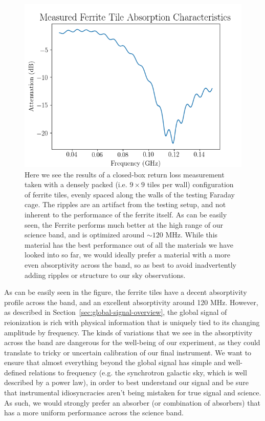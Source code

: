 \begin{figure}
    \begin{center}
    \includegraphics[width=\linewidth]{fe_absorption.png}
    \end{center}
    \caption{
        Here we see the results of a closed-box return loss measurement taken 
        with a densely packed (i.e. $9\times9$ tiles per wall) configuration of 
        ferrite tiles, evenly spaced along the walls of the testing Faraday 
        cage. The ripples are an artifact from the testing setup, and not 
        inherent to the performance of the ferrite itself. As can be easily 
        seen, the Ferrite performs much better at the high range of our science 
        band, and is optimized around $\sim120$ MHz.  While this material has 
        the best performance out of all the materials we have looked into so 
        far, we would ideally prefer a material with a more even absorptivity 
        across the band, so as best to avoid inadvertently adding ripples or 
        structure to our sky observations.
    }
    \label{fig:fe-absorption}
\end{figure}

As can be easily seen in the figure, the ferrite tiles have a decent 
absorptivity profile across the band, and an excellent absorptivity around 120 
MHz. However, as described in Section~\ref{sec:global-signal-overview}, the 
global signal of reionization is rich with physical information that is 
uniquely tied to its changing amplitude by frequency. The kinds of variations 
that we see in the absorptivity across the band are dangerous for the 
well-being of our experiment, as they could translate to tricky or uncertain 
calibration of our final instrument. We want to ensure that almost everything 
beyond the global signal has simple and well-defined relations to frequency 
(e.g. the synchrotron galactic sky, which is well described by a power law), in 
order to best understand our signal and be sure that instrumental 
idiosyncracies aren't being mistaken for true signal and science. As such, we 
would strongly prefer an absorber (or combination of absorbers) that has a more 
uniform performance across the science band.

